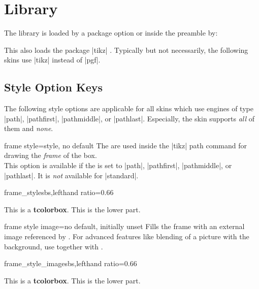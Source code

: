\clearpage
\section{Library }\label{sec:skins}%
%
The library is loaded by a package option or inside the preamble by:
\begin{dispListing}
\end{dispListing}
This also loads the package |tikz| \cite{tantau:2015a}. Typically but not necessarily,
the following skins use |tikz| instead of |pgf|.

\subsection{Style Option Keys}\label{subsec:addstyleoptions}
The following style options are applicable for all skins which
use engines of type |path|, |pathfirst|, |pathmiddle|, or |pathlast|.
Especially, the skin  supports \emph{all} of them
and  \emph{none}.

\begin{docTcbKey}{frame style}{=}{style, no default}
  The  are used inside the |tikz| path command
  for drawing the \emph{frame} of the box.\\
  This option is available if the  is set to
  |path|, |pathfirst|, |pathmiddle|, or |pathlast|.
  It is \emph{not} available for |standard|.
\begin{exdispExample*}{frame_style}{sbs,lefthand ratio=0.66}

\begin{tcolorbox}[enhanced,title=My title,
  frame style={left color=red!75!black,
               right color=blue!75!black}]
This is a \textbf{tcolorbox}.
\tcblower
This is the lower part.
\end{tcolorbox}
\end{exdispExample*}
\end{docTcbKey}


\begin{docTcbKey}{frame style image}{=}{no default, initially unset}
  Fills the frame with an external image referenced by .
  For advanced features like blending of a picture with the background,
  use  together with .
\begin{exdispExample*}{frame_style_image}{sbs,lefthand ratio=0.66}

\begin{tcolorbox}[enhanced,title=My title,
  frame style image=blueshade.png]
This is a \textbf{tcolorbox}.
\tcblower
This is the lower part.
\end{tcolorbox}
\end{exdispExample*}
\end{docTcbKey}

